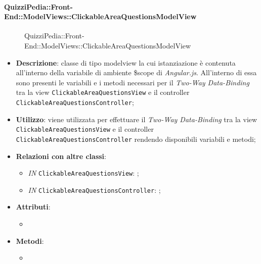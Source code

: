 \paragraph{QuizziPedia::Front-End::ModelViews::ClickableAreaQuestionsModelView}
\begin{figure} [ht]
	\centering
	\caption{QuizziPedia::Front-End::ModelViews::ClickableAreaQuestionsModelView}
\end{figure} \FloatBarrier
\begin{itemize}
	\item \textbf{Descrizione}: classe di tipo modelview la cui istanziazione è contenuta all'interno della variabile di ambiente \$scope di \textit{Angular.js}. All'interno di essa sono presenti le variabili e i metodi necessari per il \textit{Two-Way Data-Binding} tra la view \texttt{ClickableAreaQuestionsView} e il controller \texttt{ClickableAreaQuestionsController}; 
	\item \textbf{Utilizzo}: viene utilizzata per effettuare il \textit{Two-Way Data-Binding} tra la view \texttt{ClickableAreaQuestionsView} e il controller \texttt{ClickableAreaQuestionsController} rendendo disponibili variabili e metodi;
	\item \textbf{Relazioni con altre classi}:
	\begin{itemize}
		\item \textit{IN} \texttt{ClickableAreaQuestionsView}: ; 
		\item \textit{IN} \texttt{ClickableAreaQuestionsController}: ;
	\end{itemize}
	\item \textbf{Attributi}:
	\begin{itemize}
		\item
	\end{itemize}
	\item \textbf{Metodi}:
	\begin{itemize}
		\item 
	\end{itemize}
\end{itemize}


